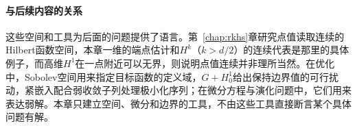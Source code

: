 \paragraph{与后续内容的关系}
这些空间和工具为后面的问题提供了语言。第~\ref{chap:rkhs}章研究点值读取连续的Hilbert函数空间，本章一维的端点估计和$H^k$（$k>d/2$）的连续代表是那里的具体例子，而高维$H^1$在一点附近可以无界，则说明点值连续并非理所当然。在优化中，Sobolev空间用来指定目标函数的定义域，$G+H_0^1$给出保持边界值的可行扰动，紧嵌入配合弱收敛子列处理极小化序列；在微分方程与演化问题中，它们用来表达弱解。本章只建立空间、微分和边界的工具，不由这些工具直接断言某个具体问题有解。
